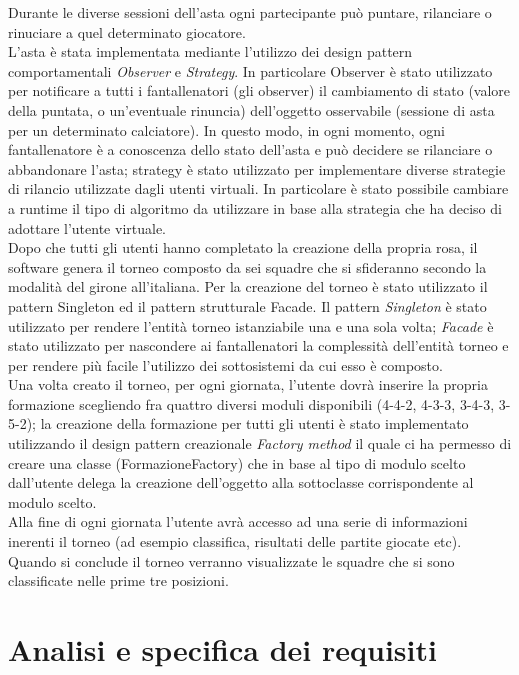 \documentclass[12pt,a4paper]{article}
\begin{document}
Durante le diverse sessioni dell'asta ogni partecipante può puntare, rilanciare o rinuciare a quel determinato giocatore.\\
L'asta è stata implementata mediante l'utilizzo dei design pattern comportamentali \textit{Observer} e \textit{Strategy}. In particolare Observer è stato utilizzato per notificare a tutti i fantallenatori (gli observer) il cambiamento di stato (valore della puntata, o un'eventuale rinuncia) dell'oggetto osservabile (sessione di asta per un determinato calciatore). In questo modo, in ogni momento, ogni fantallenatore è a conoscenza dello stato dell'asta e può decidere se rilanciare o abbandonare l'asta; strategy è stato utilizzato per implementare diverse strategie di rilancio utilizzate dagli utenti virtuali. In particolare è stato possibile cambiare a runtime il tipo di algoritmo da utilizzare in base alla strategia che ha deciso di adottare l'utente virtuale.\\
Dopo che tutti gli utenti hanno completato la creazione della propria rosa, il software genera il torneo composto da sei squadre che si sfideranno secondo la modalità del girone all'italiana. Per la creazione del torneo è stato utilizzato il pattern  Singleton ed il pattern strutturale Facade. Il pattern \textit{Singleton} è stato utilizzato per rendere l'entità torneo istanziabile una e una sola volta; \textit{Facade} è stato utilizzato per nascondere ai fantallenatori la complessità  dell'entità torneo e per rendere più facile l'utilizzo dei sottosistemi da cui esso è composto.\\
Una volta creato il torneo, per ogni giornata, l'utente dovrà inserire la propria formazione scegliendo fra quattro diversi moduli disponibili (4-4-2, 4-3-3, 3-4-3, 3-5-2); la creazione della formazione per tutti gli utenti è stato implementato utilizzando il design pattern creazionale \textit{Factory method} il quale ci ha permesso di creare una classe (FormazioneFactory) che in base al tipo di modulo scelto dall'utente delega la creazione dell'oggetto alla sottoclasse corrispondente al modulo scelto.\\
Alla fine di ogni giornata l'utente avrà accesso ad una serie di informazioni inerenti il torneo (ad esempio classifica, risultati delle partite giocate etc).\\ Quando si conclude il torneo verranno visualizzate le squadre che si sono classificate nelle prime tre posizioni.
\section{Analisi e specifica dei requisiti}
\end{document}
